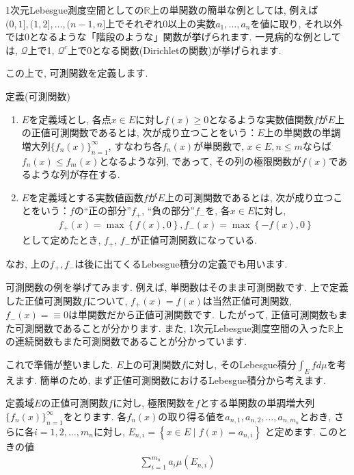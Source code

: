\par 1次元Lebesgue測度空間としての$\mathbb{R}$上の単関数の簡単な例としては, 例えば$(0,1],(1,2],…,(n-1,n]$上でそれぞれ0以上の実数$a_1,…,a_n$を値に取り, それ以外では0となるような「階段のような」関数が挙げられます. 一見病的な例としては, $\mathcal{Q}$上で1, $\mathcal{Q}^c$上で0となる関数(Dirichletの関数)が挙げられます. 
\par この上で, 可測関数を定義します. 
\begin{itembox}[l]{定義(可測関数)}
\begin{enumerate}
\item $E$を定義域とし, 各点$x\in E$に対し$f(x)\ge 0$となるような実数値関数$f$が$E$上の正値可測関数であるとは, 次が成り立つことをいう：$E$上の単関数の単調増大列$\{f_n(x)\}_{n=1}^{\infty}$, すなわち各$f_n(x)$が単関数で, $x\in E, n\le m$ならば$f_{n}(x) \le f_{m}(x)$となるような列, であって, その列の極限関数が$f(x)$であるような列が存在する. 
\item $E$を定義域とする実数値函数$f$が$E$上の可測関数であるとは, 次が成り立つことをいう：$f$の“正の部分”$f_{+}$, “負の部分”$f_{-}$を, 各$x\in E$に対し, 
\begin{eqnarray}
f_{+}(x)=\max \left\{f(x),0\right\} , f_{-}(x)=\max \left\{-f(x),0\right\} \nonumber
\end{eqnarray}
として定めたとき, $f_{+}$, $f_{-}$が正値可測関数になっている. 
\end{enumerate}
\end{itembox}
\par なお, 上の$f_{+}, f_{-}$は後に出てくるLebesgue積分の定義でも用います. 
\par 可測関数の例を挙げてみます. 例えば, 単関数はそのまま可測関数です. 上で定義した正値可測関数$f$について, $f_{+}(x)=f(x)$は当然正値可測関数, $f_{-}(x)=\equiv 0$は単関数だから正値可測関数です. したがって, 正値可測関数もまた可測関数であることが分かります. また, 1次元Lebesgue測度空間の入った$\mathbb{R}$上の連続関数もまた可測関数であることが分かっています. 
\par これで準備が整いました. $E$上の可測関数$f$に対し, そのLebesgue積分$\displaystyle \int_{E}fd\mu$を考えます. 簡単のため, まず正値可測関数におけるLebesgue積分から考えます. 
\par 定義域$E$の正値可測関数$f$に対し, 極限関数を$f$とする単関数の単調増大列$\{f_{n}(x)\}_{n=1}^{\infty}$をとります. 各$f_{n}(x)$の取り得る値を$a_{n,1},a_{n,2},\ldots,a_{n,m_{n}}$とおき, さらに各$i=1,2,\ldots,m_{n}$に対し, $\displaystyle E_{n,i}=\left\{x\in E \mid f(x)=a_{n,i}\right\}$ と定めます. このときの値
\begin{eqnarray}
\sum_{i=1}^{m_{n}}a_{i}\mu\left(E_{n,i}\right) \nonumber
\end{eqnarray}
